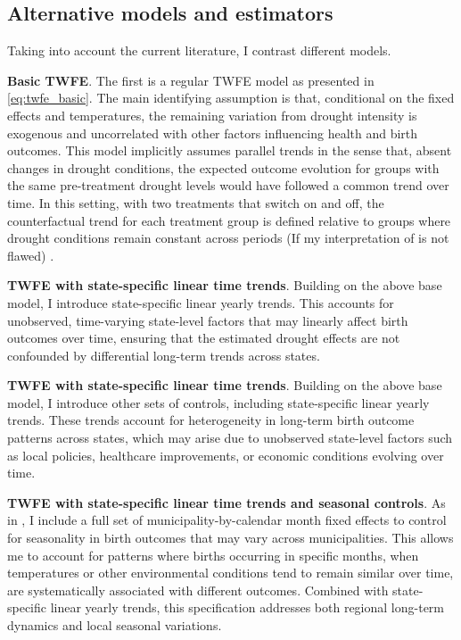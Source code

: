 \documentclass[12pt, oneside]{article}      %
\begin{document}
\subsection{Alternative models and estimators}

Taking into account the current literature, I contrast different models.

\textbf{Basic TWFE}. The first is a regular TWFE model as presented in \ref{eq:twfe_basic}. The main identifying assumption is that, conditional on the fixed effects and temperatures, the remaining variation from drought intensity is exogenous and uncorrelated with other factors influencing health and birth outcomes. This model implicitly assumes parallel trends in the sense that, absent changes in drought conditions, the expected outcome evolution for groups with the same pre-treatment drought levels would have followed a common trend over time. In this setting, with two treatments that switch on and off, the counterfactual trend for each treatment group is defined relative to groups where drought conditions remain constant across periods (If my interpretation of \cite{deChaisemartin20203} is not flawed) .

\textbf{TWFE with state-specific linear time trends}. Building on the above base model, I introduce state-specific linear yearly trends. This accounts for unobserved, time-varying state-level factors that may linearly affect birth outcomes over time, ensuring that the estimated drought effects are not confounded by differential long-term trends across states.

\textbf{TWFE with state-specific linear time trends}. Building on the above base model, I introduce other sets of controls, including state-specific linear yearly trends. These trends account for heterogeneity in long-term birth outcome patterns across states, which may arise due to unobserved state-level factors such as local policies, healthcare improvements, or economic conditions evolving over time. 

\textbf{TWFE with state-specific linear time trends and seasonal controls}. As in \cite{Cohen2022}, I include a full set of municipality-by-calendar month fixed effects to control for seasonality in birth outcomes that may vary across municipalities. This allows me to account for patterns where births occurring in specific months, when temperatures or other environmental conditions tend to remain similar over time, are systematically associated with different outcomes. Combined with state-specific linear yearly trends, this specification addresses both regional long-term dynamics and local seasonal variations.
\end{document}
